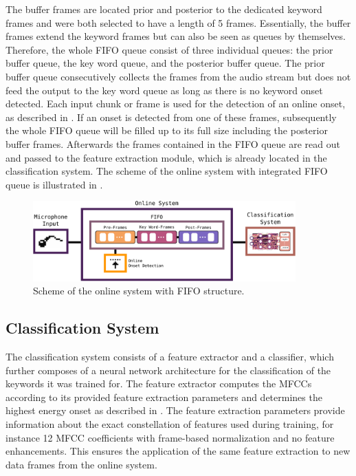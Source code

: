 The buffer frames are located prior and posterior to the dedicated keyword frames and were both selected to have a length of 5 frames.
Essentially, the buffer frames extend the keyword frames but can also be seen as queues by themselves.
Therefore, the whole FIFO queue consist of three individual queues: the prior buffer queue, the key word queue, and the posterior buffer queue.
The prior buffer queue consecutively collects the frames from the audio stream but does not feed the output to the key word queue as long as there is no keyword onset detected.
Each input chunk or frame is used for the detection of an online onset, as described in .
If an onset is detected from one of these frames, subsequently the whole FIFO queue will be filled up to its full size including the posterior buffer frames.
Afterwards the frames contained in the FIFO queue are read out and passed to the feature extraction module, which is already located in the classification system.
The scheme of the online system with integrated FIFO queue is illustrated in .
\begin{figure}[!ht]
  \centering
  \includegraphics[width=0.9\textwidth]{./6_game/figs/game_system_online.pdf}
  \caption{Scheme of the online system with FIFO structure.}
  \label{fig:game_system_online}
\end{figure}
\FloatBarrier
\noindent



\subsection{Classification System}
The classification system consists of a feature extractor and a classifier, which further composes of a neural network architecture for the classification of the keywords it was trained for.
The feature extractor computes the MFCCs according to its provided feature extraction parameters and determines the highest energy onset as described in .
The feature extraction parameters provide information about the exact constellation of features used during training, for instance 12 MFCC coefficients with frame-based normalization and no feature enhancements.
This ensures the application of the same feature extraction to new data frames from the online system.

